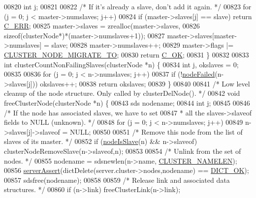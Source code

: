\begin{DoxyCode}
{{{{{{{{{{{00820     \textcolor{keywordtype}{int} j;
00821 
00822     \textcolor{comment}{/* If it's already a slave, don't add it again. */}
00823     \textcolor{keywordflow}{for} (j = 0; j < master->numslaves; j++)
00824         \textcolor{keywordflow}{if} (master->slaves[j] == slave) \textcolor{keywordflow}{return} \hyperlink{server_8h_af98ac28d5f4d23d7ed5985188e6fb7d1}{C\_ERR};
00825     master->slaves = zrealloc(master->slaves,
00826         \textcolor{keyword}{sizeof}(clusterNode*)*(master->numslaves+1));
00827     master->slaves[master->numslaves] = slave;
00828     master->numslaves++;
00829     master->flags |= \hyperlink{cluster_8h_a1d5a62356ed9f5986613c2315a358119}{CLUSTER\_NODE\_MIGRATE\_TO};
00830     \textcolor{keywordflow}{return} \hyperlink{server_8h_a303769ef1065076e68731584e758d3e1}{C\_OK};
00831 \}
00832 
00833 \textcolor{keywordtype}{int} clusterCountNonFailingSlaves(clusterNode *n) \{
00834     \textcolor{keywordtype}{int} j, okslaves = 0;
00835 
00836     \textcolor{keywordflow}{for} (j = 0; j < n->numslaves; j++)
00837         \textcolor{keywordflow}{if} (!\hyperlink{cluster_8h_a6a31c614ff4f5ac8ebaa630b0a921c3d}{nodeFailed}(n->slaves[j])) okslaves++;
00838     \textcolor{keywordflow}{return} okslaves;
00839 \}
00840 
00841 \textcolor{comment}{/* Low level cleanup of the node structure. Only called by clusterDelNode(). */}
00842 \textcolor{keywordtype}{void} freeClusterNode(clusterNode *n) \{
00843     sds nodename;
00844     \textcolor{keywordtype}{int} j;
00845 
00846     \textcolor{comment}{/* If the node has associated slaves, we have to set}
00847 \textcolor{comment}{     * all the slaves->slaveof fields to NULL (unknown). */}
00848     \textcolor{keywordflow}{for} (j = 0; j < n->numslaves; j++)
00849         n->slaves[j]->slaveof = NULL;
00850 
00851     \textcolor{comment}{/* Remove this node from the list of slaves of its master. */}
00852     \textcolor{keywordflow}{if} (\hyperlink{cluster_8h_a3c99881f6892130c902b42b1f84a0e11}{nodeIsSlave}(n) && n->slaveof) clusterNodeRemoveSlave(n->slaveof,n);
00853 
00854     \textcolor{comment}{/* Unlink from the set of nodes. */}
00855     nodename = sdsnewlen(n->name, \hyperlink{cluster_8h_ace7a882972eff7149675252938643b6e}{CLUSTER\_NAMELEN});
00856     \hyperlink{server_8h_a88114b5169b4c382df6b56506285e56a}{serverAssert}(dictDelete(server.cluster->nodes,nodename) == 
      \hyperlink{dict_8h_a2afecbeab8f7efbc183048f52f6d17e5}{DICT\_OK});
00857     sdsfree(nodename);
00858 
00859     \textcolor{comment}{/* Release link and associated data structures. */}
00860     \textcolor{keywordflow}{if} (n->link) freeClusterLink(n->link);
}}}}}}}}}}}
\end{DoxyCode}
